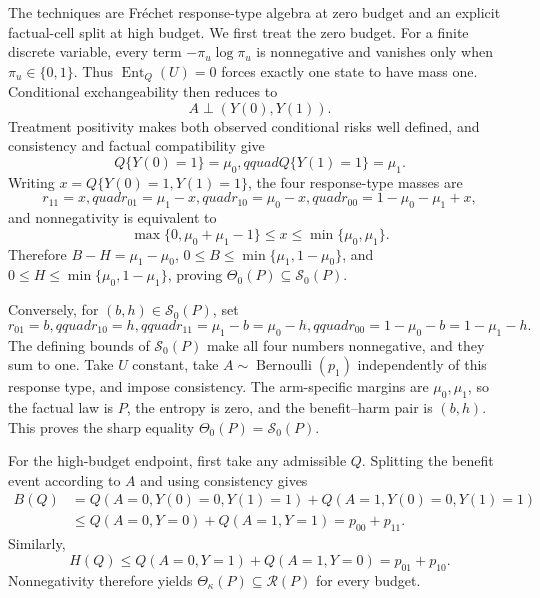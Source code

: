 The techniques are Fr\'echet response-type algebra at zero budget and an explicit factual-cell split at high budget.  We first treat the zero budget.  For a finite discrete variable, every term \(-\pi_u\log\pi_u\) is nonnegative and vanishes only when \(\pi_u\in\{0,1\}\).  Thus \(\operatorname{Ent}_Q(U)=0\) forces exactly one state to have mass one.  Conditional exchangeability then reduces to
\[
 A\perp(Y(0),Y(1)).
\]
Treatment positivity makes both observed conditional risks well defined, and consistency and factual compatibility give
\[
 Q\{Y(0)=1\}=\mu_0,qquad Q\{Y(1)=1\}=\mu_1.
\]
Writing \(x=Q\{Y(0)=1,Y(1)=1\}\), the four response-type masses are
\[
 r_{11}=x,quad r_{01}=\mu_1-x,quad r_{10}=\mu_0-x,quad
 r_{00}=1-\mu_0-\mu_1+x,
\]
and nonnegativity is equivalent to
\[
 \max\{0,\mu_0+\mu_1-1\}\leq x\leq\min\{\mu_0,\mu_1\}.
\]
Therefore \(B-H=\mu_1-\mu_0\), \(0\leq B\leq\min\{\mu_1,1-\mu_0\}\), and \(0\leq H\leq\min\{\mu_0,1-\mu_1\}\), proving \(\Theta_0(P)\subseteq\mathcal S_0(P)\).

Conversely, for \((b,h)\in\mathcal S_0(P)\), set
\[
 r_{01}=b,qquad r_{10}=h,qquad
 r_{11}=\mu_1-b=\mu_0-h,qquad
 r_{00}=1-\mu_0-b=1-\mu_1-h.
\]
The defining bounds of \(\mathcal S_0(P)\) make all four numbers nonnegative, and they sum to one.  Take \(U\) constant, take \(A\sim\operatorname{Bernoulli}(p_1)\) independently of this response type, and impose consistency.  The arm-specific margins are \(\mu_0,\mu_1\), so the factual law is \(P\), the entropy is zero, and the benefit--harm pair is \((b,h)\).  This proves the sharp equality \(\Theta_0(P)=\mathcal S_0(P)\).

For the high-budget endpoint, first take any admissible \(Q\).  Splitting the benefit event according to \(A\) and using consistency gives
\[
 \begin{aligned}
 B(Q)
 &=Q(A=0,Y(0)=0,Y(1)=1)+Q(A=1,Y(0)=0,Y(1)=1)\\
 &\leq Q(A=0,Y=0)+Q(A=1,Y=1)=p_{00}+p_{11}.
 \end{aligned}
\]
Similarly,
\[
 H(Q)\leq Q(A=0,Y=1)+Q(A=1,Y=0)=p_{01}+p_{10}.
\]
Nonnegativity therefore yields \(\Theta_\kappa(P)\subseteq\mathcal R(P)\) for every budget.

